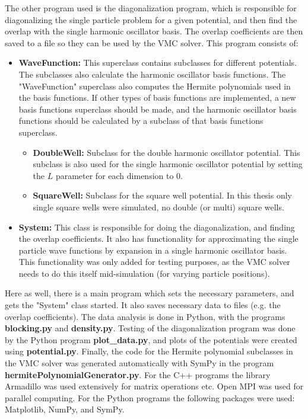 \documentclass[../main.tex]{subfiles}
\begin{document}
\begin{appendices}
The other program used is the diagonalization program, which is responsible for diagonalizing the single particle problem for a given potential, and then find the overlap with the single harmonic oscillator basis. The overlap coefficients are then saved to a file so they can be used by the VMC solver. This program consists of:
\begin{itemize}
    \item \textbf{WaveFunction:} This superclass contains subclasses for different potentials. The subclasses also calculate the harmonic oscillator basis functions. The "WaveFunction" superclass also computes the Hermite polynomials used in the basis functions. If other types of basis functions are implemented, a new basis functions superclass should be made, and the harmonic oscillator basis functions should be calculated by a subclass of that basis functions superclass. 
    \begin{itemize}
        \item \textbf{DoubleWell:} Subclass for the double harmonic oscillator potential. This subclass is also used for the single harmonic oscillator potential by setting the $L$ parameter for each dimension to $0$.
        \item \textbf{SquareWell:} Subclass for the square well potential. In this thesis only single square wells were simulated, no double (or multi) square wells.
    \end{itemize}
    \item \textbf{System:} This class is responsible for doing the diagonalization, and finding the overlap coefficients. It also has functionality for approximating the single particle wave functions by expansion in a single harmonic oscillator basis. This functionality was only added for testing purposes, as the VMC solver needs to do this itself mid-simulation (for varying particle positions).
\end{itemize}

Here as well, there is a main program which sets the necessary parameters, and gets the "System" class started. It also saves necessary data to files (e.g. the overlap coefficients). The data analysis is done in Python, with the programs {\bf blocking.py} and {\bf density.py}. Testing of the diagonalization program was done by the Python program \textbf{plot\_data.py}, and plots of the potentials were created using \textbf{potential.py}. Finally, the code for the Hermite polynomial subclasses in the VMC solver was generated automatically with SymPy in the program \textbf{hermitePolynomialGenerator.py}. For the C++ programs the library Armadillo\cite{Armadillo} was used extensively for matrix operations etc. Open MPI\cite{Open MPI} was used for parallel computing. For the Python programs the following packages were used: Matplotlib\cite{Matplotlib}, NumPy\cite{NumPy}, and SymPy\cite{SymPy}.


\end{appendices}
\end{document}
